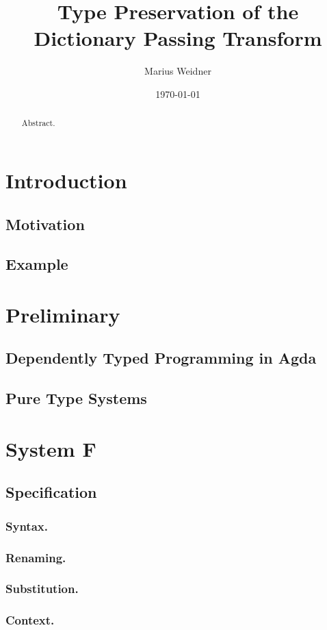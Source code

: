 \documentclass[runningheads]{llncs}
\begin{document}
\title{Type Preservation of the Dictionary Passing Transform}
\author{Marius Weidner}
\date\today
\maketitle
\begin{abstract}
  Abstract.
\end{abstract}

\section{Introduction}
\subsection{Motivation}
\subsection{Example}
\section{Preliminary}
\subsection{Dependently Typed Programming in Agda}
\subsection{Pure Type Systems}
\section{System F}
\subsection{Specification}
\subsubsection{Syntax.} 
\subsubsection{Renaming.}
\subsubsection{Substitution.}
\subsubsection{Context.}
\end{document}
